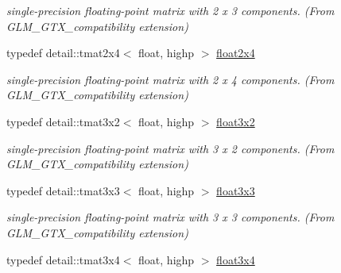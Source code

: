 \begin{CompactItemize}
\begin{CompactList}\small\item\em single-precision floating-point matrix with 2 x 3 components. (From GLM\_\-GTX\_\-compatibility extension) \item\end{CompactList}\item 
\hypertarget{group__gtx__compatibility_gaff795523eb814705d3f1cc7fd3421f2}{
typedef detail::tmat2x4$<$ float, highp $>$ \hyperlink{group__gtx__compatibility_gaff795523eb814705d3f1cc7fd3421f2}{float2x4}}
\label{group__gtx__compatibility_gaff795523eb814705d3f1cc7fd3421f2}

\begin{CompactList}\small\item\em single-precision floating-point matrix with 2 x 4 components. (From GLM\_\-GTX\_\-compatibility extension) \item\end{CompactList}\item 
\hypertarget{group__gtx__compatibility_g19bcbd4d65c70cd07907b2d688bc84ed}{
typedef detail::tmat3x2$<$ float, highp $>$ \hyperlink{group__gtx__compatibility_g19bcbd4d65c70cd07907b2d688bc84ed}{float3x2}}
\label{group__gtx__compatibility_g19bcbd4d65c70cd07907b2d688bc84ed}

\begin{CompactList}\small\item\em single-precision floating-point matrix with 3 x 2 components. (From GLM\_\-GTX\_\-compatibility extension) \item\end{CompactList}\item 
\hypertarget{group__gtx__compatibility_g11458ecd63c32b7e502d90091a6d0a6c}{
typedef detail::tmat3x3$<$ float, highp $>$ \hyperlink{group__gtx__compatibility_g11458ecd63c32b7e502d90091a6d0a6c}{float3x3}}
\label{group__gtx__compatibility_g11458ecd63c32b7e502d90091a6d0a6c}

\begin{CompactList}\small\item\em single-precision floating-point matrix with 3 x 3 components. (From GLM\_\-GTX\_\-compatibility extension) \item\end{CompactList}\item 
\hypertarget{group__gtx__compatibility_g53eb75b08b92aa34886397150c983943}{
typedef detail::tmat3x4$<$ float, highp $>$ \hyperlink{group__gtx__compatibility_g53eb75b08b92aa34886397150c983943}{float3x4}}
\label{group__gtx__compatibility_g53eb75b08b92aa34886397150c983943}


\end{CompactItemize}
